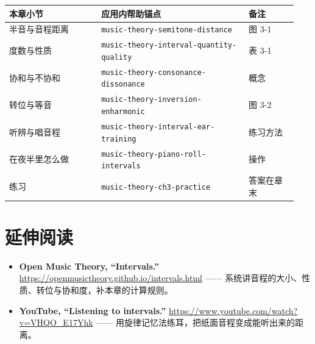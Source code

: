 \begin{center}
\footnotesize
\setlength{\tabcolsep}{3pt}
\begin{longtable}{p{0.30\linewidth}p{0.48\linewidth}p{0.16\linewidth}}
\toprule
本章小节 & 应用内帮助锚点 & 备注 \\
\midrule
\endhead
半音与音程距离 & \texttt{music-theory-semitone-distance} & 图 3-1 \\
度数与性质 & \texttt{music-theory-interval-quantity-quality} & 表 3-1 \\
协和与不协和 & \texttt{music-theory-consonance-dissonance} & 概念 \\
转位与等音 & \texttt{music-theory-inversion-enharmonic} & 图 3-2 \\
听辨与唱音程 & \texttt{music-theory-interval-ear-training} & 练习方法 \\
在夜半里怎么做 & \texttt{music-theory-piano-roll-intervals} & 操作 \\
练习 & \texttt{music-theory-ch3-practice} & 答案在章末 \\
\bottomrule
\end{longtable}
\end{center}

\section*{延伸阅读}
\begin{itemize}
  \item \textbf{Open Music Theory, “Intervals.”} \url{https://openmusictheory.github.io/intervals.html} —— 系统讲音程的大小、性质、转位与协和度，补本章的计算规则。
  \item \textbf{YouTube, “Listening to intervals.”} \url{https://www.youtube.com/watch?v=VHQO_E17Yhk} —— 用旋律记忆法练耳，把纸面音程变成能听出来的距离。
\end{itemize}


